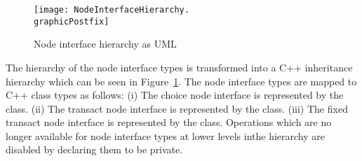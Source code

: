 \begin{figure}[h]
\centering
\texttt{[image: NodeInterfaceHierarchy.\\graphicPostfix]}\\
\caption{\label{node-interface-hierarchy}Node interface hierarchy as UML}
\end{figure}

The hierarchy of the node interface types is transformed into
a C++ inheritance hierarchy which can be seen in Figure~\ref{node-interface-hierarchy}.
The node interface types are mapped to C++ class types as follows:
(i) The choice node interface is represented by the  class.
(ii) The transact node interface is represented by the  class.
(iii) The fixed transact node interface is represented by the  class.
Operations which are no longer available for node interface types
at lower levels inthe hierarchy are disabled by declaring them to be private.

